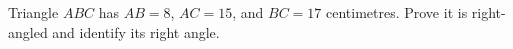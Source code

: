 Triangle $ABC$ has $AB=8$, $AC=15$, and $BC=17$ centimetres. Prove it is right-angled and identify its right angle.
